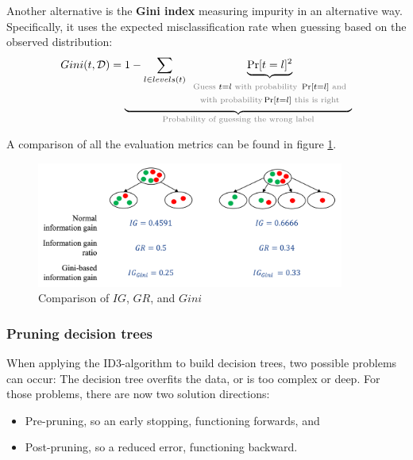 Another alternative is the \textbf{Gini index} measuring impurity in an alternative way. Specifically, it uses the expected misclassification rate when guessing based on the observed distribution:
\renewcommand{\arraystretch}{0.6}
\begin{align*}
  Gini(t,\mathcal{D}) = \underbrace{1-\sum_{l\in levels(t)}\underbrace{\Pr[t=l]^2}_{\begin{array}{c}
    \scriptstyle\text{\color{gray}Guess } t=l \text{ \color{gray} with probability } \Pr[t=l] \text{ \color{gray} and}\\
    \scriptstyle\text{\color{gray}with probability}  \Pr[t=l] \text{ \color{gray} this is right}
  \end{array}}}_{\text{\color{gray}Probability of guessing the wrong label}}
\end{align*}
\renewcommand{\arraystretch}{1} 

A comparison of all the evaluation metrics can be found in figure \ref{fig:3_id3_alternative_evaluation}.

\begin{figure}[h]
  \centering
  \includegraphics[width=0.9\textwidth]{assets/trees/id3/comp_evaluation_metrics.png}
  \caption{Comparison of $IG$, $GR$, and $Gini$}
  \label{fig:3_id3_alternative_evaluation}
\end{figure}


\subsubsection*{Pruning decision trees}
When applying the ID3-algorithm to build decision trees, two possible problems can occur: The decision tree overfits the data, or is too complex or deep.
For those problems, there are now two solution directions:
\begin{itemize}
  \item Pre-pruning, so an early stopping, functioning forwards, and
  \item Post-pruning, so a reduced error, functioning backward.
\end{itemize}

